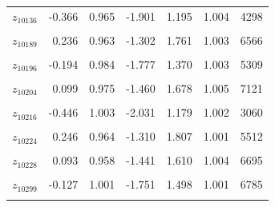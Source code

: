 \begin{longtable}{lrrrrrr}
$z_{10136}$ & -0.366 & 0.965 & -1.901 & 1.195 & 1.004 & 4298\\
\cellcolor{gray!10}{$z_{10167}$} & \cellcolor{gray!10}{0.195} & \cellcolor{gray!10}{0.989} & \cellcolor{gray!10}{-1.391} & \cellcolor{gray!10}{1.793} & \cellcolor{gray!10}{1.004} & \cellcolor{gray!10}{6106}\\
$z_{10189}$ & 0.236 & 0.963 & -1.302 & 1.761 & 1.003 & 6566\\
\cellcolor{gray!10}{$z_{10195}$} & \cellcolor{gray!10}{-0.484} & \cellcolor{gray!10}{1.006} & \cellcolor{gray!10}{-2.060} & \cellcolor{gray!10}{1.154} & \cellcolor{gray!10}{1.002} & \cellcolor{gray!10}{3283}\\
$z_{10196}$ & -0.194 & 0.984 & -1.777 & 1.370 & 1.003 & 5309\\
\cellcolor{gray!10}{$z_{10200}$} & \cellcolor{gray!10}{-0.229} & \cellcolor{gray!10}{0.963} & \cellcolor{gray!10}{-1.786} & \cellcolor{gray!10}{1.340} & \cellcolor{gray!10}{1.002} & \cellcolor{gray!10}{5356}\\
$z_{10204}$ & 0.099 & 0.975 & -1.460 & 1.678 & 1.005 & 7121\\
\cellcolor{gray!10}{$z_{10208}$} & \cellcolor{gray!10}{-0.433} & \cellcolor{gray!10}{0.984} & \cellcolor{gray!10}{-1.932} & \cellcolor{gray!10}{1.214} & \cellcolor{gray!10}{1.001} & \cellcolor{gray!10}{2889}\\
$z_{10216}$ & -0.446 & 1.003 & -2.031 & 1.179 & 1.002 & 3060\\
\cellcolor{gray!10}{$z_{10220}$} & \cellcolor{gray!10}{0.150} & \cellcolor{gray!10}{0.975} & \cellcolor{gray!10}{-1.429} & \cellcolor{gray!10}{1.701} & \cellcolor{gray!10}{1.003} & \cellcolor{gray!10}{5641}\\
$z_{10224}$ & 0.246 & 0.964 & -1.310 & 1.807 & 1.001 & 5512\\
\cellcolor{gray!10}{$z_{10226}$} & \cellcolor{gray!10}{0.079} & \cellcolor{gray!10}{0.977} & \cellcolor{gray!10}{-1.497} & \cellcolor{gray!10}{1.618} & \cellcolor{gray!10}{1.001} & \cellcolor{gray!10}{7433}\\
$z_{10228}$ & 0.093 & 0.958 & -1.441 & 1.610 & 1.004 & 6695\\
\cellcolor{gray!10}{$z_{10240}$} & \cellcolor{gray!10}{0.351} & \cellcolor{gray!10}{0.964} & \cellcolor{gray!10}{-1.192} & \cellcolor{gray!10}{1.860} & \cellcolor{gray!10}{1.002} & \cellcolor{gray!10}{4040}\\
$z_{10299}$ & -0.127 & 1.001 & -1.751 & 1.498 & 1.001 & 6785\\
\cellcolor{gray!10}{$z_{10326}$} & \cellcolor{gray!10}{0.106} & \cellcolor{gray!10}{0.947} & \cellcolor{gray!10}{-1.429} & \cellcolor{gray!10}{1.597} & \cellcolor{gray!10}{1.001} & \cellcolor{gray!10}{4926}\\

\end{longtable}
